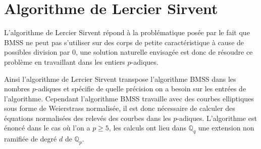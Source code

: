 \documentclass[10pt,a4paper]{book}
\theoremstyle{plain}
\theoremstyle{definition}
\theoremstyle{definition}
\theoremstyle{definition}
\theoremstyle{definition}
\theoremstyle{remark}
\theoremstyle{remark}
\theoremstyle{definition}
\begin{document}


\section{Algorithme de Lercier Sirvent}
L'algorithme de Lercier Sirvent répond à la problématique posée par le fait que BMSS ne peut pas s'utiliser sur des corps de petite caractéristique à cause de possibles division par $0$, une solution naturelle envisagée est donc de résoudre ce problème en travaillant dans les entiers $p$-adiques.

Ainsi l'algorithme de Lercier Sirvent transpose l'algorithme BMSS dans les nombres $p$-adiques et spécifie de quelle précision on a besoin sur les entrées de l'algorithme. Cependant l'algorithme  BMSS travaille avec des courbes elliptiques sous forme de Weierstrass normalisée, il est donc nécessaire de calculer des équations normalisées des relevés des courbes dans les $p$-adiques. L'algorithme est énoncé dans le cas où l'on a $p \geqslant 5$, les calculs ont lieu dans $\mathbb{Q}_q$ une extension non ramifiée de degré $d$ de $\mathbb{Q}_p$.
\end{document}
